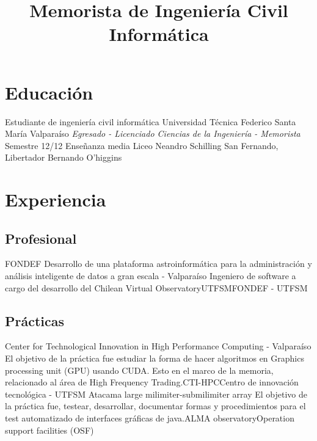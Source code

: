 \documentclass[11pt,a4paper]{moderncv}
\title{Memorista de Ingeniería Civil Informática}
\begin{document}
\maketitle

\section{Educación}
	{Estudiante de ingeniería civil informática}
	{Universidad Técnica Federico Santa María}
	{Valparaíso}
	{\emph{Egresado - Licenciado Ciencias de la Ingeniería - Memorista}}
	{Semestre 12/12}
	{Enseñanza media}
	{Liceo Neandro Schilling}
	{San Fernando, Libertador Bernando O'higgins}
	{}{}

\section{Experiencia}
\subsection{Profesional}
	{FONDEF Desarrollo de una plataforma astroinformática para la administración y análisis inteligente de datos a gran escala - Valparaíso}
	{Ingeniero de software a cargo del desarrollo del Chilean Virtual Observatory}{UTFSM}{FONDEF - UTFSM}{}

\subsection{Prácticas}
	{Center for Technological Innovation in High Performance Computing - Valparaíso}
	{El objetivo de la práctica fue estudiar la forma de hacer algoritmos en Graphics processing unit (GPU) usando CUDA. Esto en el marco
	de la memoria, relacionado al área de High Frequency Trading.}{CTI-HPC}{Centro de innovación tecnológica - UTFSM}{}
	{Atacama large milimiter-submilimiter array}
	{El objetivo de la práctica fue, testear, desarrollar, documentar formas y procedimientos para el test automatizado de 
	interfaces gráficas de java.}{ALMA observatory}{Operation support facilities (OSF)}{}
\end{document}
